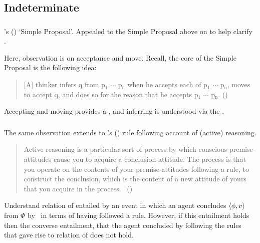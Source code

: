 \subsection{Indeterminate}
\label{cha:var:sec:indeterminate}

\subsubsection{\textcite{Wright:2014tt}}

\begin{note}
  \citeauthor{Wright:2014tt}'s (\citeyear{Wright:2014tt}) `Simple Proposal'.
  Appealed to the Simple Proposal above on  to help clarify \supportI{}.

  Here, observation is on acceptance and move.
  Recall, the core of the Simple Proposal is the following idea:

  \begin{quote}
    [A] thinker infers q from p\(_{1}\) \(\cdots\) p\(_{\text{n}}\) when he accepts each of p\(_{1}\) \(\cdots\) p\(_{\text{n}}\), moves to accept q, and does so for the reason that he accepts p\(_{1}\) \(\cdots\) p\(_{\text{n}}\).%
    \mbox{}\hfill\mbox{(\citeyear[33]{Wright:2014tt})}
  \end{quote}

  Accepting and moving provides a \wit{}, and inferring is understood via the \wit{}.
\end{note}

\subsubsection{\textcite{Broome:2002aa}}

\begin{note}
  The same observation extends to \citeauthor{Broome:2002aa}'s (\citeyear{Broome:2013aa}) rule following account of (active) reasoning.

  \begin{quote}
    Active reasoning is a particular sort of process by which conscious premise-attitudes cause you to acquire a conclusion-attitude.
    The process is that you operate on the contents of your premise-attitudes following a rule, to construct the conclusion, which is the content of a new attitude of yours that you acquire in the process.\newline
    \mbox{ }\hfill\mbox{(\citeyear[234]{Broome:2002aa})}
  \end{quote}

  Understand relation of \support{} entailed by an event in which an agent concludes \(\langle \phi, v \rangle\) from \(\Phi\) by~\supportI{} in terms of having followed a rule.
  However, if this entailment holds then the converse entailment, that the agent concluded by following the rules that gave rise to relation of \support{} does not hold.
\end{note}

